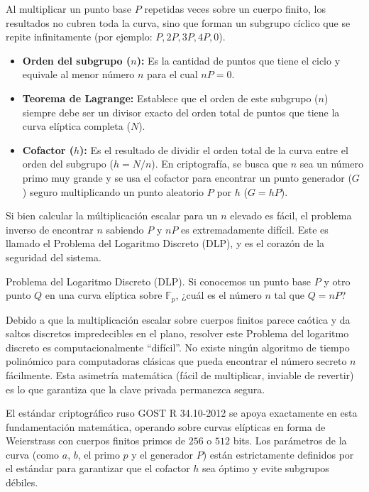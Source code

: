 Al multiplicar un punto base $P$ repetidas veces sobre un cuerpo finito, los resultados no cubren toda la curva, sino que forman un subgrupo cíclico que se repite infinitamente (por ejemplo: $P, 2P, 3P, 4P, 0$).
\begin{itemize}
    \item \textbf{Orden del subgrupo ($n$):} Es la cantidad de puntos que tiene el ciclo y equivale al menor número $n$ para el cual $nP = 0$.
    \item \textbf{Teorema de Lagrange:} Establece que el orden de este subgrupo ($n$) siempre debe ser un divisor exacto del orden total de puntos que tiene la curva elíptica completa ($N$).
    \item \textbf{Cofactor ($h$):} Es el resultado de dividir el orden total de la curva entre el orden del subgrupo ($h = N / n$). En criptografía, se busca que $n$ sea un número primo muy grande y se usa el cofactor para encontrar un punto generador ($G$) seguro multiplicando un punto aleatorio $P$ por $h$ ($G = hP$).
\end{itemize}

Si bien calcular la múltiplicación escalar para un $n$ elevado es fácil, el problema inverso de encontrar $n$ sabiendo $P$ y $nP$ es extremadamente difícil. Este es llamado el Problema del Logaritmo Discreto (DLP), y es el corazón de la seguridad del sistema. 

\begin{definition} Problema del Logaritmo Discreto (DLP).
Si conocemos un punto base $P$ y otro punto $Q$ en una curva elíptica sobre $\mathbb{F}_p$, ¿cuál es el número $n$ tal que $Q = nP$? \\
\end{definition}

Debido a que la multiplicación escalar sobre cuerpos finitos parece caótica y da saltos discretos impredecibles en el plano, resolver este Problema del logaritmo discreto es computacionalmente ``difícil''. No existe ningún algoritmo de tiempo polinómico para computadoras clásicas que pueda encontrar el número secreto $n$ fácilmente. Esta asimetría matemática (fácil de multiplicar, inviable de revertir) es lo que garantiza que la clave privada permanezca segura.

El estándar criptográfico ruso GOST R 34.10-2012 se apoya exactamente en esta fundamentación matemática, operando sobre curvas elípticas en forma de Weierstrass con cuerpos finitos primos de $256$ o $512$ bits. Los parámetros de la curva (como $a$, $b$, el primo $p$ y el generador $P$) están estrictamente definidos por el estándar para garantizar que el cofactor $h$ sea óptimo y evite subgrupos débiles.